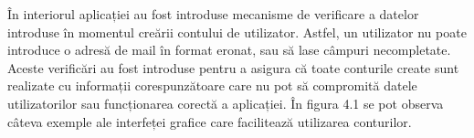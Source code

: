 \documentclass[12pt,a4paper]{report}
\theoremstyle{definition}
\theoremstyle{remark}
\begin{document}
În interiorul aplicației au fost introduse mecanisme de verificare a datelor introduse în momentul creării contului de utilizator. Astfel, un utilizator nu poate introduce o adresă de mail în format eronat,  sau să lase câmpuri necompletate. Aceste verificări au fost introduse pentru a asigura că toate conturile create sunt realizate cu informații corespunzătoare care nu pot să compromită datele utilizatorilor sau funcționarea corectă a aplicației. În figura 4.1 se pot observa câteva exemple ale interfeței grafice care facilitează utilizarea conturilor.
\begin{figure}[H]
  \centering
  \hspace{0.3cm}
  \hspace{0.3cm}

\end{figure}
\end{document}
